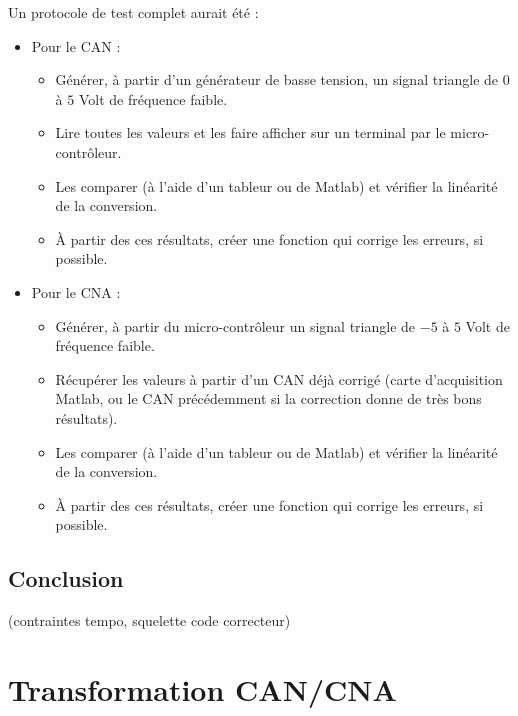 Un protocole de test complet aurait été :\\
\begin{itemize}
\item Pour le CAN : 
	\begin{itemize}
		\item Générer, à partir d'un générateur de basse tension, un signal triangle de $0$ à $5$ Volt de fréquence faible.
		\item Lire toutes les valeurs et les faire afficher sur un terminal par le micro-contrôleur.
		\item Les comparer (à l'aide d'un tableur ou de Matlab) et vérifier la linéarité de la conversion.
		\item À partir des ces résultats, créer une fonction qui corrige les erreurs, si possible.
	\end{itemize}

\item Pour le CNA :
	\begin{itemize}
		\item Générer, à partir du micro-contrôleur un signal triangle de $-5$ à $5$ Volt de fréquence faible.
		\item Récupérer les valeurs à partir d'un CAN déjà corrigé (carte d'acquisition Matlab, ou le CAN précédemment si la correction donne de très bons résultats).
		\item Les comparer (à l'aide d'un tableur ou de Matlab) et vérifier la linéarité de la conversion.
		\item À partir des ces résultats, créer une fonction qui corrige les erreurs, si possible.
	\end{itemize}
\end{itemize}

	\subsection{Conclusion}
	  	(contraintes tempo, squelette code correcteur)


\section{Transformation CAN/CNA}
